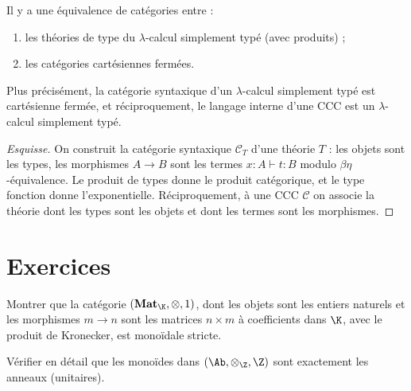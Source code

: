 \begin{theoreme}[Lambek]\label{thm:lambek}
Il y a une équivalence de catégories entre :
\begin{enumerate}[label=(\alph*)]
\item les théories de type du $\lambda$-calcul simplement typé
      (avec produits) ;
\item les catégories cartésiennes fermées.
\end{enumerate}
Plus précisément, la catégorie syntaxique d'un $\lambda$-calcul
simplement typé est cartésienne fermée, et réciproquement,
le langage interne d'une CCC est un $\lambda$-calcul simplement typé.
\end{theoreme}

\begin{proof}[Esquisse]
On construit la catégorie syntaxique $\mathcal{C}_T$ d'une théorie $T$ :
les objets sont les types, les morphismes $A \to B$ sont les termes
$x : A \vdash t : B$ modulo $\beta\eta$-équivalence.
Le produit de types donne le produit catégorique,
et le type fonction donne l'exponentielle.
Réciproquement, à une CCC $\mathcal{C}$ on associe la théorie
dont les types sont les objets et dont les termes sont les morphismes.
\end{proof}


\section{Exercices}\label{sec:exo-monoidales}

\begin{exercice}\label{exo:monoidale-strict}
Montrer que la catégorie $(\mathbf{Mat}_\K, \otimes, 1)$, dont les
objets sont les entiers naturels et les morphismes $m \to n$ sont
les matrices $n \times m$ à coefficients dans $\K$, avec le produit
de Kronecker, est monoïdale stricte.
\end{exercice}

\begin{exercice}\label{exo:monoide-dans-Ab}
Vérifier en détail que les monoïdes dans $(\Ab, \otimes_\Z, \Z)$
sont exactement les anneaux (unitaires).
\end{exercice}

